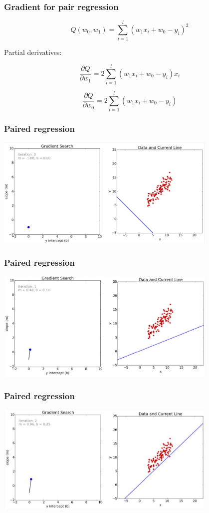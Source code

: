 \documentclass[default]{beamer}
\begin{document}
	\begin{frame}
		\frametitle{Gradient for pair regression}
		
		\Large
		\[
			Q(w_0,w_1)=\sum_{i=1}^l (w_1x_i+w_0-y_i)^2
		\]

		Partial derivatives:

			
		\[
		\frac{\partial Q}{\partial w_1}=2\sum_{i=1}^l (w_1x_i+w_0-y_i)x_i
		\]
		
		\[
		\frac{\partial Q}{\partial w_0}=2\sum_{i=1}^l (w_1x_i+w_0-y_i)
		\]
		
	\end{frame}		

	
	\begin{frame}	
		\frametitle{Paired regression}
		
		\centering
		\includegraphics[width=0.8\textwidth]{linear_22.jpg}
	\end{frame}

	\begin{frame}	
\frametitle{Paired regression}

\centering
\includegraphics[width=0.8\textwidth]{linear_23.jpg}
\end{frame}

	\begin{frame}	
\frametitle{Paired regression}

\centering
\includegraphics[width=0.8\textwidth]{linear_24.jpg}
\end{frame}
\end{document}
